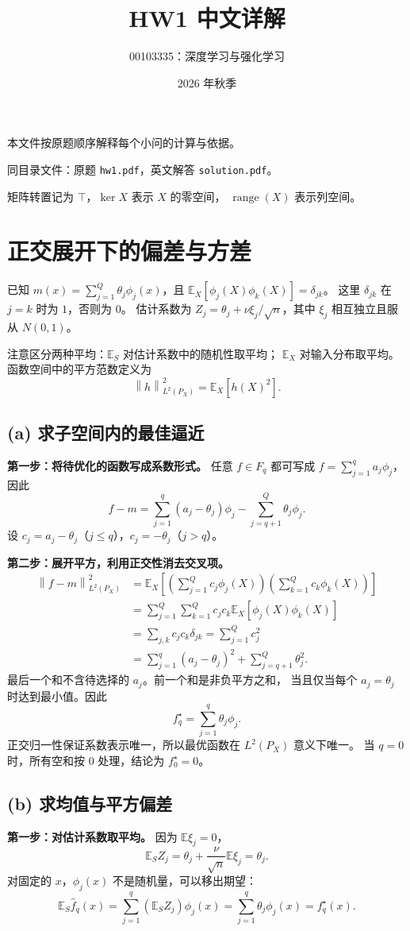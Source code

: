 \documentclass[UTF8,a4paper,11pt,fontset=fandol]{ctexart}
\title{HW1 中文详解}
\author{00103335：深度学习与强化学习}
\date{2026 年秋季}
\newcommand{\E}{\mathbb E}
\newcommand{\norm}[1]{\left\lVert#1\right\rVert}
\begin{document}
\pagestyle{plain}
\maketitle
本文件按原题顺序解释每个小问的计算与依据。

同目录文件：原题 \texttt{hw1.pdf}，英文解答 \texttt{solution.pdf}。

矩阵转置记为 $\top$，$\ker X$ 表示 $X$ 的零空间，
$\operatorname{range}(X)$ 表示列空间。

\section{正交展开下的偏差与方差}
已知 $m(x)=\sum_{j=1}^Q\theta_j\phi_j(x)$，且
$\E_X[\phi_j(X)\phi_k(X)]=\delta_{jk}$。
这里 $\delta_{jk}$ 在 $j=k$ 时为 $1$，否则为 $0$。
估计系数为 $Z_j=\theta_j+\nu\xi_j/\sqrt n$，其中
$\xi_j$ 相互独立且服从 $N(0,1)$。

注意区分两种平均：$\E_S$ 对估计系数中的随机性取平均；
$\E_X$ 对输入分布取平均。函数空间中的平方范数定义为
\[
 \norm h_{L^2(P_X)}^2=\E_X[h(X)^2].
\]

\subsection*{(a) 求子空间内的最佳逼近}
\textbf{第一步：将待优化的函数写成系数形式。}
任意 $f\in F_q$ 都可写成 $f=\sum_{j=1}^q a_j\phi_j$，因此
\[
 f-m=\sum_{j=1}^q(a_j-\theta_j)\phi_j
       -\sum_{j=q+1}^Q\theta_j\phi_j.
\]
设 $c_j=a_j-\theta_j$（$j\leq q$），$c_j=-\theta_j$（$j>q$）。

\textbf{第二步：展开平方，利用正交性消去交叉项。}
\begin{align*}
 \norm{f-m}_{L^2(P_X)}^2
 &=\E_X\left[\left(\sum_{j=1}^Q c_j\phi_j(X)\right)
                    \left(\sum_{k=1}^Q c_k\phi_k(X)\right)\right]\\
 &=\sum_{j=1}^Q\sum_{k=1}^Q c_jc_k\E_X[\phi_j(X)\phi_k(X)]\\
 &=\sum_{j,k}c_jc_k\delta_{jk}
 =\sum_{j=1}^Q c_j^2\\
 &=\sum_{j=1}^q(a_j-\theta_j)^2+\sum_{j=q+1}^Q\theta_j^2.
\end{align*}
最后一个和不含待选择的 $a_j$。前一个和是非负平方之和，
当且仅当每个 $a_j=\theta_j$ 时达到最小值。因此
\[
 \boxed{f_q^\star=\sum_{j=1}^q\theta_j\phi_j.}
\]
正交归一性保证系数表示唯一，所以最优函数在 $L^2(P_X)$ 意义下唯一。
当 $q=0$ 时，所有空和按 $0$ 处理，结论为 $f_0^\star=0$。

\subsection*{(b) 求均值与平方偏差}
\textbf{第一步：对估计系数取平均。}
因为 $\E\xi_j=0$，
\[
 \E_S Z_j=\theta_j+\frac\nu{\sqrt n}\E\xi_j=\theta_j.
\]
对固定的 $x$，$\phi_j(x)$ 不是随机量，可以移出期望：
\[
 \E_S\widehat f_q(x)=\sum_{j=1}^q(\E_S Z_j)\phi_j(x)
 =\sum_{j=1}^q\theta_j\phi_j(x)=f_q^\star(x).
\]
\end{document}
